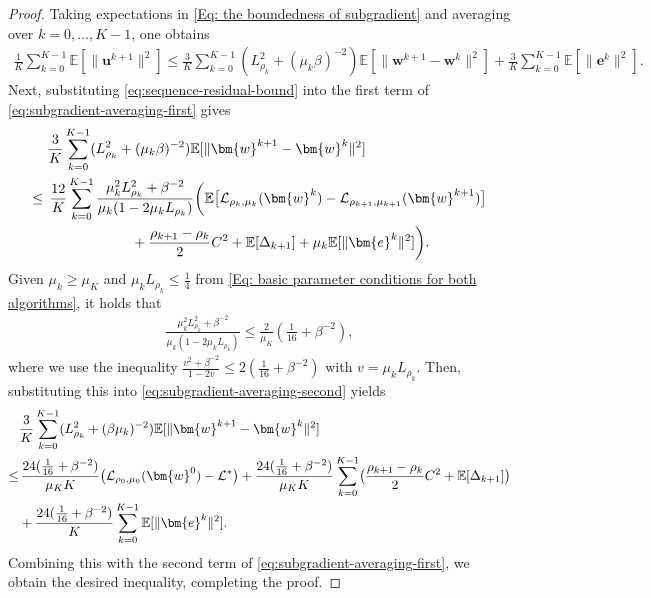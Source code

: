 \documentclass{article}
\theoremstyle{plain}
\theoremstyle{definition}
\theoremstyle{remark}
\newcommand{\EE}{\mathbb{E}}
\newcommand{\be}{\bm{e}}
\newcommand{\bu}{\bm{u}}
\newcommand{\calL}{\mathcal{L}}
\newcommand{\bw}{\bm{w}}
\newcommand{\sumK}{\sum_{k=0}^{K-1}}
\numberwithin{equation}{section}
\begin{document}
\begin{proof}
Taking expectations in \eqref{Eq: the boundedness of subgradient} and averaging over $k = 0,\dots, K-1$, one obtains
    \begin{align}
        \frac{1}{K}\sum_{k=0}^{K-1}\EE[\| \bu^{k+1}\|^{2}] \leq \frac{3}{K}\sum_{k=0}^{K-1}( L_{\rho_k}^{2}+ (\mu_{k}\beta )^{-2}) \EE[\| \bw^{k+1}- \bw^{k}\|^{2}] + \frac{3}{K}\sumK \EE[\| \be^{k}\|^{2}]. \label{eq:subgradient-averaging-first}
    \end{align}
Next, substituting \eqref{eq:sequence-residual-bound} into the first term of \eqref{eq:subgradient-averaging-first} gives
\begin{align}
  &\frac{3}{K}\sum_{k=0}^{K-1}
  ( L_{\rho_k}^{2}+ (\mu_{k}\beta)^{-2})
  \EE[\| \bw^{k+1}- \bw^{k}\|^{2}] \notag \\
   \leq{} & \,\frac{12}{K}\sum_{k=0}^{K-1}
   \frac{\mu_{k}^{2}L_{\rho_k}^{2}+ \beta^{-2}}
   {\mu_{k}(1 - 2 \mu_{k}L_{\rho_k})}\biggl(
   \EE\bigl[
   \calL_{\rho_k, \mu_k}(\bw^{k})
   - \calL_{\rho_{k+1}, \mu_{k+1}}(\bw^{k+1})
   \bigr] \notag \\
   &\qquad\qquad\qquad
   + \frac{\rho_{k+1}- \rho_{k}}{2}C^{2}
   + \EE[\Delta_{k+1}]
   +\mu_{k}\EE[\| \be^{k}\|^{2}]
   \biggr).
   \label{eq:subgradient-averaging-second}
    \end{align}
    Given $\mu_{k}\geq\mu_{K}$ and $\mu_{k}L_{\rho_k}\leq \tfrac{1}{4}$ from \eqref{Eq: basic parameter conditions for both algorithms}, it holds that
\begin{align}
    \frac{\mu_{k}^{2}L_{\rho_k}^{2}+ \beta^{-2}}{\mu_{k}( 1 - 2 \mu_{k}L_{\rho_k})}\leq \frac{2}{\mu_{K}}( \frac{1}{16}+ \beta^{-2}),
\end{align}
where we use the inequality $\frac{v^2 + \beta^{-2}}{1 - 2v}\leq 2 (\tfrac{1}{16} + \beta^{-2})$ with $v = \mu_{k}L_{\rho_k}$.
Then, substituting this into \eqref{eq:subgradient-averaging-second} yields
\begin{align}
    & \frac{3}{K}\sum_{k=0}^{K-1}( L_{\rho_k}^{2}+ (\beta \mu_{k})^{-2})
    \EE[\| \bw^{k+1}- \bw^{k}\|^{2}] \notag \\
    \leq &\,\frac{24 ( \tfrac{1}{16} + \beta^{-2})}{\mu_{K}K}
    \bigl( \calL_{\rho_0, \mu_0}(\bw^{0}) - \calL^{*}\bigr) + \frac{24 ( \tfrac{1}{16} + \beta^{-2})}{\mu_{K}K} \sumK \bigl( \frac{\rho_{k+1}- \rho_{k}}{2} C^{2} + \EE[\Delta_{k+1}]\bigr) \notag \\
    & + \frac{24 ( \tfrac{1}{16} + \beta^{-2})}{K}\sumK \EE[\| \be^{k}\|^{2}]. \notag
\end{align}
Combining this with the second term of \eqref{eq:subgradient-averaging-first}, we obtain the desired inequality, completing the proof.
\end{proof}
\end{document}
